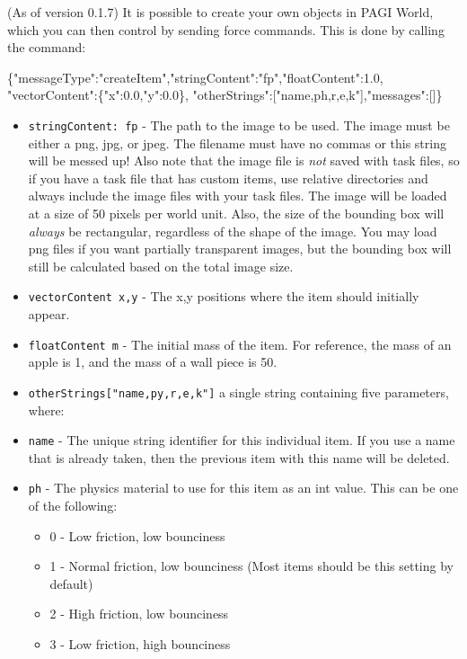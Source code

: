 (As of version 0.1.7) It is possible to create your own objects in PAGI World, which you can then control by sending force commands. This is done by calling the command:

\begin{center}
\scriptsize{\{"messageType":"createItem","stringContent":"fp","floatContent":1.0, \\"vectorContent":\{"x":0.0,"y":0.0\}, "otherStrings":["name,ph,r,e,k"],"messages":[]\}}
\end{center}

\begin{itemize}
\item \texttt{stringContent: fp} - The path to the image to be used. The image must be either a png, jpg, or jpeg. The filename must have no commas or this string will be messed up! Also note that the image file is \textit{not} saved with task files, so if you have a task file that has custom items, use relative directories and always include the image files with your task files. The image will be loaded at a size of 50 pixels per world unit. Also, the size of the bounding box will \textit{always} be rectangular, regardless of the shape of the image. You may load png files if you want partially transparent images, but the bounding box will still be calculated based on the total image size.
\item \texttt{vectorContent x,y} - The x,y positions where the item should initially appear.
\item \texttt{floatContent m} - The initial mass of the item. For reference, the mass of an apple is 1, and the mass of a wall piece is 50.
\item \texttt{otherStrings["name,py,r,e,k"]} a single string containing five parameters, where:
\item \texttt{name} - The unique string identifier for this individual item. If you use a name that is already taken, then the previous item with this name will be deleted.
\item \texttt{ph} - The physics material to use for this item as an int value. This can be one of the following:
	\begin{itemize}
	\item 0 - Low friction, low bounciness
	\item 1 - Normal friction, low bounciness (Most items should be this setting by default)
	\item 2 - High friction, low bounciness
	\item 3 - Low friction, high bounciness

\end{itemize}
\end{itemize}
